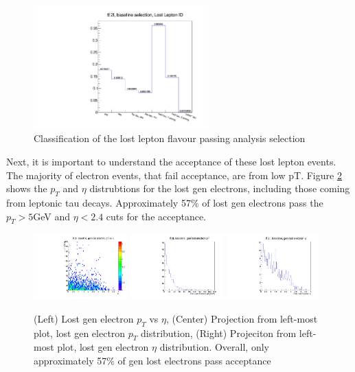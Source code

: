 \begin{figure}[ht]
\centering
\includegraphics[width=0.60\textwidth]{Figures/studiesLostLepton/lostLeptonStudies__ttbar2l__lostLeptonID.pdf}
\caption{\label{fig:lost_lepton_studies:classification} Classification of the lost lepton flavour passing analysis selection }
\end{figure}

Next, it is important to understand the acceptance of these lost lepton events.  The majority of electron events, that fail acceptance, are from low pT.  Figure \ref{fig:lost_lepton_studies:el_acceptance} shows the $p_{T}$ and $\eta$ distrubtions for the lost gen electrons, including those coming from leptonic tau decays. Approximately 57\% of lost gen electrons pass the $p_{T}>5$GeV and $\eta<2.4$ cuts for the acceptance.    

\begin{figure}[ht]
\centering
\includegraphics[width=0.32\textwidth]{Figures/studiesLostLepton/lostLeptonStudies__ttbar2l__genLostElectron__pt_vs_eta.pdf}
\includegraphics[width=0.32\textwidth]{Figures/studiesLostLepton/lostLeptonStudies__ttbar2l__genLostElectron__pt_vs_eta__projectionY__pt.pdf}
\includegraphics[width=0.32\textwidth]{Figures/studiesLostLepton/lostLeptonStudies__ttbar2l__genLostElectron__pt_vs_eta__projectionX__eta.pdf}
\caption{\label{fig:lost_lepton_studies:el_acceptance} (Left) Lost gen electron $p_{T}$ vs $\eta$, (Center) Projection from left-most plot, lost gen electron $p_{T}$ distribution, (Right) Projeciton from left-most plot, lost gen electron $\eta$ distribution.  Overall, only approximately 57\% of gen lost electrons pass acceptance }
\end{figure}

